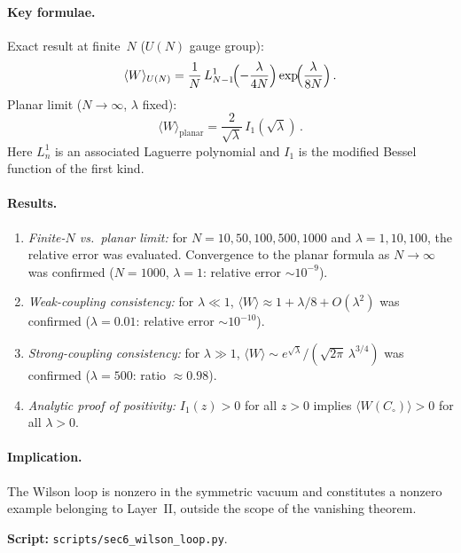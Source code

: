 \documentclass[
  aps,
  prd,
  preprint,
  groupedaddress,
  nofootinbib,
  longbibliography
]{revtex4-2}
\theoremstyle{remark}
\begin{document}
\paragraph{Key formulae.}
Exact result at finite~$N$ ($U(N)$ gauge group):
\begin{equation}\label{eq:Wilson-finiteN}
  \langle W\rangle_{U(N)}
  = \frac{1}{N}\,L_{N-1}^{1}\!\Bigl(-\frac{\lambda}{4N}\Bigr)
    \exp\!\Bigl(\frac{\lambda}{8N}\Bigr)\,.
\end{equation}
Planar limit ($N\to\infty$, $\lambda$ fixed):
\begin{equation}\label{eq:Wilson-planar2}
  \langle W\rangle_{\mathrm{planar}}
  = \frac{2}{\sqrt{\lambda}}\,I_1(\sqrt{\lambda})\,.
\end{equation}
Here $L_n^1$ is an associated Laguerre polynomial and $I_1$ is
the modified Bessel function of the first kind.

\paragraph{Results.}
\begin{enumerate}
\item \emph{Finite-$N$ vs.\ planar limit:}
  for $N=10,50,100,500,1000$ and
  $\lambda=1,10,100$, the relative error was evaluated.
  Convergence to the planar formula as $N\to\infty$ was confirmed
  ($N=1000$, $\lambda=1$: relative error $\sim 10^{-9}$).
\item \emph{Weak-coupling consistency:}
  for $\lambda\ll 1$,
  $\langle W\rangle\approx 1+\lambda/8+O(\lambda^2)$
  was confirmed ($\lambda=0.01$: relative error
  $\sim 10^{-10}$).
\item \emph{Strong-coupling consistency:}
  for $\lambda\gg 1$,
  $\langle W\rangle\sim
  e^{\sqrt{\lambda}}/(\sqrt{2\pi}\,\lambda^{3/4})$
  was confirmed ($\lambda=500$: ratio $\approx 0.98$).
\item \emph{Analytic proof of positivity:}
  $I_1(z)>0$ for all $z>0$ implies
  $\langle W(C_\circ)\rangle>0$ for all $\lambda>0$.
\end{enumerate}

\paragraph{Implication.}
The Wilson loop is nonzero in the symmetric vacuum and
constitutes a nonzero example belonging to Layer~II, outside the
scope of the vanishing theorem.

\noindent\textbf{Script:}
\texttt{scripts/sec6\_wilson\_loop.py}.
\end{document}
